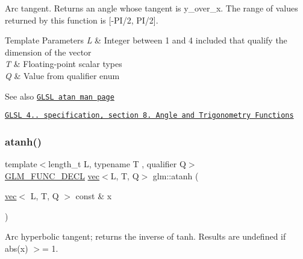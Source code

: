 Arc tangent. Returns an angle whose tangent is y\+\_\+over\+\_\+x. The range of values returned by this function is \mbox{[}-\/\+P\+I/2, P\+I/2\mbox{]}.


\begin{DoxyTemplParams}{Template Parameters}
{\em L} & Integer between 1 and 4 included that qualify the dimension of the vector \\
\hline
{\em T} & Floating-\/point scalar types \\
\hline
{\em Q} & Value from qualifier enum\\
\hline
\end{DoxyTemplParams}
\begin{DoxySeeAlso}{See also}
\href{http://www.opengl.org/sdk/docs/manglsl/xhtml/atan.xml}{\tt G\+L\+SL atan man page} 

\href{http://www.opengl.org/registry/doc/GLSLangSpec.4.20.8.pdf}{\tt G\+L\+SL 4.. specification, section 8. Angle and Trigonometry Functions} 
\end{DoxySeeAlso}
\mbox{\label{group__core__func__trigonometric_gabc925650e618357d07da255531658b87}} 
\subsubsection{\texorpdfstring{atanh()}{atanh()}}
{\footnotesize\ttfamily template$<$length\+\_\+t L, typename T , qualifier Q$>$ \\
\mbox{\hyperlink{setup_8hpp_ab2d052de21a70539923e9bcbf6e83a51}{G\+L\+M\+\_\+\+F\+U\+N\+C\+\_\+\+D\+E\+CL}} \mbox{\hyperlink{structglm_1_1vec}{vec}}$<$L, T, Q$>$ glm\+::atanh (\begin{DoxyParamCaption}\item[{\mbox{\hyperlink{structglm_1_1vec}{vec}}$<$ L, T, Q $>$ const \&}]{x }\end{DoxyParamCaption})}

Arc hyperbolic tangent; returns the inverse of tanh. Results are undefined if abs(x) $>$= 1.


